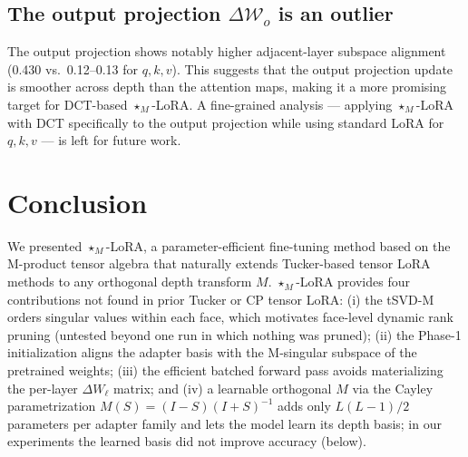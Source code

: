 \documentclass{article}
\newcommand{\DeltaW}{\Delta\mathcal{W}}
\theoremstyle{plain}
\begin{document}
\subsection{The output projection $\DeltaW_o$ is an outlier}
\label{sec:analysis_o_proj}

The output projection shows notably higher adjacent-layer subspace alignment
(0.430 vs.\ 0.12--0.13 for $q,k,v$).
This suggests that the output projection update is smoother across depth than
the attention maps, making it a more promising target for DCT-based $\star_M$-LoRA.
A fine-grained analysis — applying $\star_M$-LoRA with DCT specifically to the output
projection while using standard LoRA for $q,k,v$ — is left for future work.

\section{Conclusion}
\label{sec:conclusion}

We presented $\star_M$-LoRA, a parameter-efficient fine-tuning method based on the
M-product tensor algebra that naturally extends Tucker-based tensor LoRA methods
to any orthogonal depth transform $M$.
$\star_M$-LoRA provides four contributions not found in prior Tucker or CP tensor LoRA:
(i) the tSVD-M orders singular values within each face, which motivates face-level dynamic rank pruning
(untested beyond one run in which nothing was pruned);
(ii) the Phase-1 initialization aligns the adapter basis with the M-singular subspace
of the pretrained weights;
(iii) the efficient batched forward pass avoids materializing the per-layer $\Delta W_\ell$ matrix;
and (iv) a learnable orthogonal $M$ via the Cayley parametrization
$M(S) = (I-S)(I+S)^{-1}$ adds only $L(L{-}1)/2$ parameters per adapter family
and lets the model learn its depth basis; in our experiments the learned basis did not improve accuracy (below).
\end{document}
